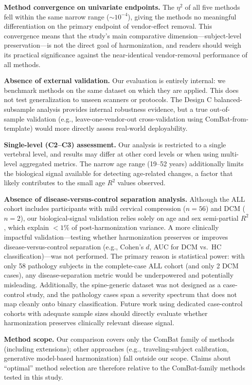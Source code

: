 \documentclass[12pt,a4paper]{article}
\begin{document}
\textbf{Method convergence on univariate endpoints.} The $\eta^2$ of all five methods fell within the same narrow range ($\sim 10^{-4}$), giving the methods no meaningful differentiation on the primary endpoint of vendor-effect removal. This convergence means that the study's main comparative dimension---subject-level preservation---is not the direct goal of harmonization, and readers should weigh its practical significance against the near-identical vendor-removal performance of all methods.

\textbf{Absence of external validation.} Our evaluation is entirely internal: we benchmark methods on the same dataset on which they are applied. This does not test generalization to unseen scanners or protocols. The Design C balanced-subsample analysis provides internal robustness evidence, but a true out-of-sample validation (e.g., leave-one-vendor-out cross-validation using ComBat-from-template) would more directly assess real-world deployability.

\textbf{Single-level (C2--C3) assessment.} Our analysis is restricted to a single vertebral level, and results may differ at other cord levels or when using multi-level aggregated metrics. The narrow age range (19--52 years) additionally limits the biological signal available for detecting age-related changes, a factor that likely contributes to the small age $R^2$ values observed.

\textbf{Absence of disease-versus-control separation analysis.} Although the ALL cohort includes participants with mild cervical compression ($n=56$) and DCM ($n=2$), our biological-signal validation relies solely on age and sex semi-partial $R^2$, which explain $<1\%$ of post-harmonization variance. A more clinically impactful validation---testing whether harmonization preserves or improves disease-versus-control separation (e.g., Cohen's $d$, AUC for DCM vs.\ HC classification)---was not performed. The primary reason is statistical power: with only 58 pathology subjects in the complete-case ALL cohort (and only 2 DCM cases), any disease-separation metric would be underpowered and potentially misleading. Additionally, the spine-generic dataset was not designed as a case-control study, and the pathology cases span a severity spectrum that does not map cleanly onto binary classification. Future work using dedicated case-control cohorts with adequate sample sizes should directly evaluate whether harmonization preserves clinically relevant disease signal.

\textbf{Method scope.} Our comparison covers only the ComBat family of methods (including extensions); other approaches (e.g., traveling-subject calibration, generative model-based harmonization) fall outside our scope. Claims about ``optimal'' method selection are therefore relative to the ComBat-family methods tested in this study.
\end{document}
